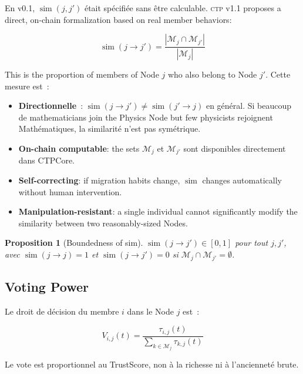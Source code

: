 \documentclass[12pt,a4paper]{article}
\theoremstyle{definition}
\theoremstyle{plain}
\newtheorem{proposition}{Proposition}[section]
\theoremstyle{remark}
\newcommand{\CTP}{\textsc{ctp}}
\newcommand{\trustscore}{\tau}
\newcommand{\1}{\mathbf{1}}
\begin{document}
En v0.1, $\operatorname{sim}(j, j')$ était spécifiée sans être calculable.
\CTP{} v1.1 proposes a direct, on-chain formalization based on
real member behaviors:

\begin{equation}
\boxed{\operatorname{sim}(j \to j') =
\frac{|\mathcal{M}_j \cap \mathcal{M}_{j'}|}{|\mathcal{M}_j|}}
\label{eq:sim}
\end{equation}

This is the proportion of members of Node $j$ who also belong to
Node $j'$. Cette mesure est~:

\begin{itemize}
  \item \textbf{Directionnelle}~: $\operatorname{sim}(j \to j') \neq
    \operatorname{sim}(j' \to j)$ en général. Si beaucoup de
    mathematicians join the Physics Node but few physicists
    rejoignent Mathématiques, la similarité n'est pas symétrique.
  \item \textbf{On-chain computable}: the sets $\mathcal{M}_j$
    et $\mathcal{M}_{j'}$ sont disponibles directement dans CTPCore.
  \item \textbf{Self-correcting}: if migration habits
    change, $\operatorname{sim}$ changes automatically without
    human intervention.
  \item \textbf{Manipulation-resistant}: a single individual cannot
    significantly modify the similarity between two
    reasonably-sized Nodes.
\end{itemize}

\begin{proposition}[Boundedness of sim]
$\operatorname{sim}(j \to j') \in [0,1]$ pour tout $j, j'$, avec
$\operatorname{sim}(j \to j) = 1$ et
$\operatorname{sim}(j \to j') = 0$ si $\mathcal{M}_j \cap \mathcal{M}_{j'} = \emptyset$.
\end{proposition}

\subsection{Voting Power}

Le droit de décision du membre $i$ dans le Node $j$ est~:

\begin{equation}
V_{i,j}(t) = \frac{\trustscore_{i,j}(t)}{\displaystyle\sum_{k \in \mathcal{M}_j} \trustscore_{k,j}(t)}
\label{eq:vote}
\end{equation}

Le vote est proportionnel au TrustScore, non à la richesse ni à l'ancienneté brute.
\end{document}

